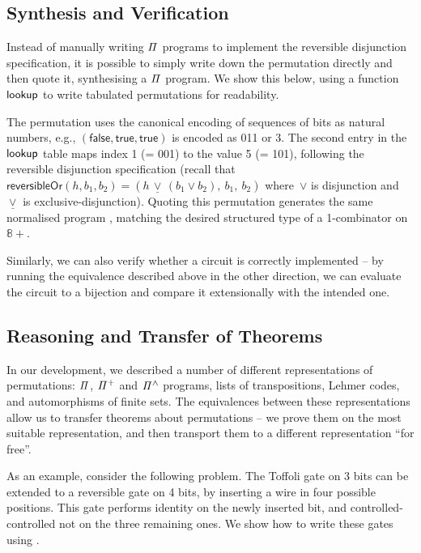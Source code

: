 \subsection{Synthesis and Verification}

Instead of manually writing $\mathit{\Pi}$ programs to implement the reversible disjunction specification, it is possible to
simply write down the permutation directly and then quote it, synthesising a $\mathit{\Pi}$ program. We show this below,
using a function $\operatorname{\mathsf{lookup}}$ to write tabulated permutations for readability.

\medskip
\resetperm{}

\noindent
The permutation uses the canonical encoding of sequences of bits as natural numbers, e.g.,
${(\mathsf{false},\mathsf{true},\mathsf{true})}$ is encoded as 011 or 3. The second entry in the $\operatorname{\mathsf{lookup}}$ table
maps index 1 (= 001) to the value 5 (= 101), following the reversible disjunction specification (recall that
$\mathsf{reversibleOr}(h,b_1,b_2) = (h \,\underline{\vee}\, (b_1 \vee b_2), ~b_1, ~b_2)$ where~$\vee$ is disjunction
and~$\underline{\vee}$ is exclusive-disjunction). Quoting this permutation generates the same normalised program
, matching the desired structured type of a 1-combinator on $\mathbb{8}+$.

Similarly, we can also verify whether a circuit is correctly implemented -- by running the equivalence described above
in the other direction, we can evaluate the circuit to a bijection and compare it extensionally with the intended one.

\subsection{Reasoning and Transfer of Theorems}

In our development, we described a number of different representations of permutations: $\mathit{\Pi}$, $\mathit{{\Pi}^{+}}$ and
$\mathit{{\Pi}^{\wedge}}$ programs, lists of transpositions, Lehmer codes, and automorphisms of finite sets. The equivalences between
these representations allow us to transfer theorems about permutations -- we prove them on the most suitable
representation, and then transport them to a different representation ``for free''.

As an example, consider the following problem. The Toffoli gate on 3 bits can be extended to a reversible gate on 4
bits, by inserting a wire in four possible positions. This gate performs identity on the newly inserted bit, and
controlled-controlled not on the three remaining ones. We show how to write these gates using .
\medskip
\extendedToffoli{}

